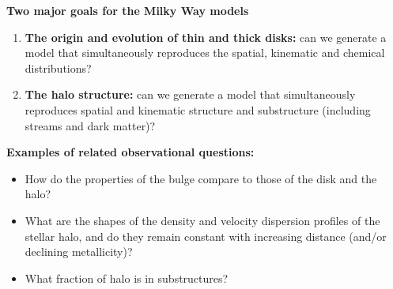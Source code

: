 \documentclass[letterpaper,landscape]{slides}
\begin{document}


\begin{slide}
\begin{center}
\bfseries
{\large {\color{blue} Two major goals for the Milky Way models} }
\end{center}
\begin{enumerate}
            \item {\bf The origin and evolution of thin and thick disks:} can we generate a model
                  that simultaneously reproduces the spatial, kinematic and chemical distributions? 
             \item {\bf The halo structure:} can we generate a model that simultaneously  
                             reproduces spatial and kinematic structure and substructure
                              (including streams and dark matter)? 
\end{enumerate}
\vskip -0.47in
{\color{red} \bf Examples of related observational questions:}
\vskip -0.7in
  \begin{itemize}
  \item {\color{blue} How do the properties of the bulge compare to those of the disk and the halo?} 
   \item {\color{blue} What are the shapes of the density and velocity dispersion profiles of the stellar halo, and 
                do they remain constant with increasing distance (and/or declining metallicity)?}
  \item {\color{blue} What fraction of halo is in substructures? }
\end{itemize}


\vfill
\end{slide}
 
\end{document}
